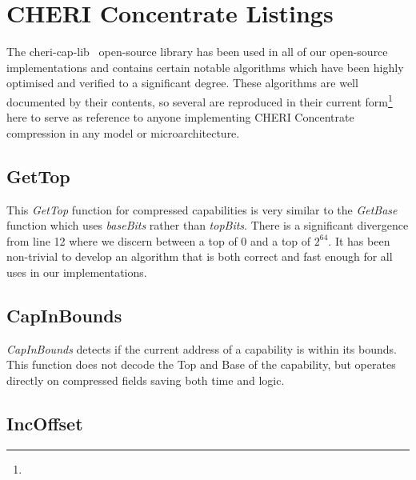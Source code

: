 \chapter{CHERI Concentrate Listings}
\label{app:cheri-128-listings}

The cheri-cap-lib~\cite{CHERI-cheri-cap-lib} open-source library has been used in all of our open-source~\cite{CHERI-cheri-cpu,CHERI-Piccolo,CHERI-Flute,CHERI-Toooba} implementations and contains certain notable algorithms which have been highly optimised and verified to a significant degree.
These algorithms are well documented by their contents, so several are reproduced in their current form\footnote{} here to serve as reference to anyone implementing CHERI Concentrate compression in any model or microarchitecture.

\section{GetTop}
\label{sec:cheri-128-listings-gettop}

This \emph{GetTop} function for compressed capabilities is very similar to the \emph{GetBase} function which uses \emph{baseBits} rather than \emph{topBits}.
There is a significant divergence from line 12 where we discern between a top of 0 and a top of $2^{64}$.
It has been non-trivial to develop an algorithm that is both correct and fast enough for all uses in our implementations.



\section{CapInBounds}
\label{sec:cheri-128-listings-capinbounds}

\emph{CapInBounds} detects if the current address of a capability is within its bounds.
This function does not decode the Top and Base of the capability,
but operates directly on compressed fields saving both time and logic.



\section{IncOffset}
\label{sec:cheri-128-listings-incoffset}

